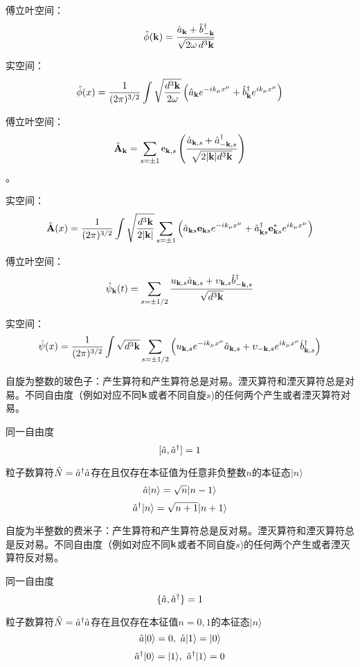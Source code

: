 \documentclass[CJK]{beamer}
\begin{document}
\begin{frame}
\bch
傅立叶空间：
$${\hat{\phi}}({\mathbf{k}}) = \frac{{\hat{a}}_{{\mathbf{k}}}+{\hat{b}^\dagger}_{-{\mathbf{k}}}}{\sqrt{2\omega\, d^3{\mathbf{k}}}}$$


\skipline
实空间：
$${\hat{\phi}}(x) = \frac{1}{(2\pi)^{3/2}} \int \sqrt{\frac{d^3{\mathbf{k}}}{2\omega}} \left({\hat{a}}_{{\mathbf{k}}} e^{-ik_\mu x^\mu} + {\hat{b}^\dagger}_{{\mathbf{k}}}e^{ik_\mu x^\mu}\right) $$
\ech
\end{frame}

\begin{frame}
\bch

傅立叶空间：
$$ \hat{{\mathbf{A}}}_{{\mathbf{k}}} = \sum_{s=\pm 1} \mathrm{e}_{{\mathbf{k}},s}\left(\frac{{\hat{a}}_{{\mathbf{k}},s} + {\hat{a}^\dagger}_{-{\mathbf{k}},s}}{\sqrt{2 |{\mathbf{k}}| d^3{\mathbf{k}}}}\right)$$。


\skipline
实空间：
$$\hat{{\mathbf{A}}}(x) = \frac{1}{(2\pi)^{3/2}} \int \sqrt{\frac{d^3{\mathbf{k}}}{2|{\mathbf{k}}|}} \sum_{s=\pm 1}\left({\hat{a}}_{{\mathbf{k}} s} \mathbf{e}_{{\mathbf{k}} s} e^{-ik_\mu x^\mu} + {\hat{a}^\dagger}_{{\mathbf{k}} s} \mathbf{e}^*_{{\mathbf{k}} s} e^{ik_\mu x^\mu}\right) $$
\ech
\end{frame}

\begin{frame}
\bch
傅立叶空间：
$$\hat\psi_{{\mathbf{k}}}(t) = \sum_{s=\pm 1/2} \frac{u_{{\mathbf{k}},s}{\hat{a}}_{{\mathbf{k}},s} + \upsilon_{{\mathbf{k}},s}{\hat{b}^\dagger}_{-{\mathbf{k}},s}}{\sqrt{d^3{\mathbf{k}}}} $$

实空间：
$$\hat\psi(x) = \frac{1}{(2\pi)^{3/2}}\int \sqrt{d^3{\mathbf{k}}} \sum_{s=\pm 1/2} \left(u_{{\mathbf{k}},s}e^{-{\dot{\imath}} k_\mu x^\mu} {\hat{a}}_{{\mathbf{k}},s} + \upsilon_{-{\mathbf{k}},s}e^{{\dot{\imath}} k_\mu x^\mu} {\hat{b}^\dagger}_{{\mathbf{k}},s}\right)$$
\ech
\end{frame}

\begin{frame}
\bch
自旋为整数的玻色子：产生算符和产生算符总是对易。湮灭算符和湮灭算符总是对易。不同自由度（例如对应不同${\mathbf{k}}$或者不同自旋$s$)的任何两个产生或者湮灭算符对易。

同一自由度
$$[{\hat{a}}, {\hat{a}^\dagger}] = 1$$

\skipline
粒子数算符$\hat{N}={\hat{a}^\dagger}{\hat{a}}$存在且仅存在本征值为任意非负整数$n$的本征态$|n\rangle$
$${\hat{a}}|n\rangle = \sqrt{n}|n-1\rangle $$
$${\hat{a}^\dagger}|n\rangle = \sqrt{n+1}|n+1\rangle$$

\ech
\end{frame}

\begin{frame}
\bch
自旋为半整数的费米子：产生算符和产生算符总是反对易。湮灭算符和湮灭算符总是反对易。不同自由度（例如对应不同${\mathbf{k}}$或者不同自旋$s$)的任何两个产生或者湮灭算符反对易。

同一自由度
$$\{{\hat{a}}, {\hat{a}^\dagger}\} = 1$$

\skipline
粒子数算符$\hat{N}={\hat{a}^\dagger}{\hat{a}}$存在且仅存在本征值$n=0,1$的本征态$|n\rangle$
$${\hat{a}}|0 \rangle = 0,\ {\hat{a}}|1\rangle = |0\rangle $$
$${\hat{a}^\dagger}|0 \rangle = |1\rangle, \  {\hat{a}^\dagger}|1\rangle = 0$$
 
\ech
\end{frame}
\end{document}
